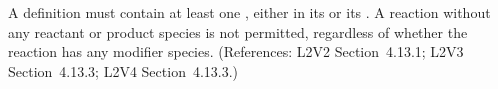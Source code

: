 A \Reaction definition must contain at least one \SpeciesReference, either
in its  or its .  A reaction
without any reactant or product species is not permitted, regardless of
whether the reaction has any modifier species.  (References: L2V2
Section~4.13.1; L2V3 Section~4.13.3; L2V4 Section~4.13.3.)
